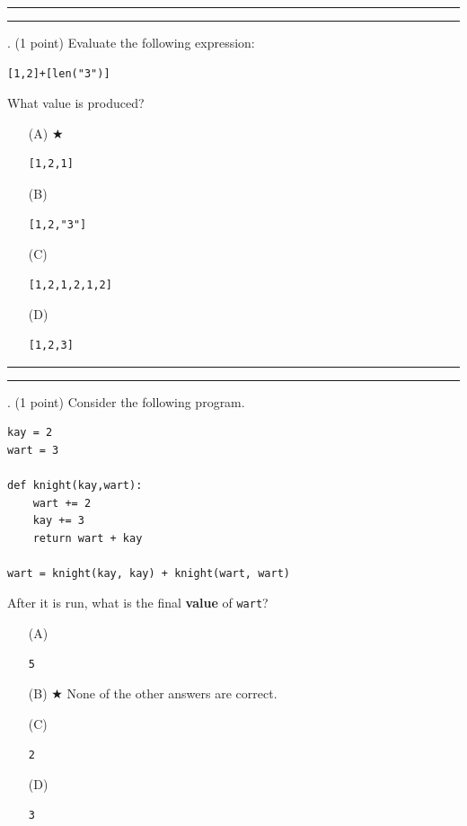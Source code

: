 \documentclass{article}
\begin{document}
\vspace*{2em}
\hrule
\vspace{2em}

\vspace{2em}
\hrule height 2pt


\newpage
{}. (1 point)
Evaluate the following expression:
\begin{verbatim}
[1,2]+[len("3")]
\end{verbatim}
What value is produced?


\begin{enumerate}
\item[(A)] $\bigstar$ 
\begin{verbatim}[1,2,1]\end{verbatim}

\item[(B)]
\begin{verbatim}[1,2,"3"]\end{verbatim}

\item[(C)]
\begin{verbatim}[1,2,1,2,1,2]\end{verbatim}

\item[(D)]
\begin{verbatim}[1,2,3]\end{verbatim}

\end{enumerate}

\vspace*{2em}
\hrule
\vspace{2em}

\vspace{2em}
\hrule height 2pt


\newpage
{}. (1 point)
Consider the following program.
\begin{verbatim}
kay = 2
wart = 3

def knight(kay,wart):
    wart += 2
    kay += 3
    return wart + kay

wart = knight(kay, kay) + knight(wart, wart)
\end{verbatim}
After it is run, what is the final \textbf{value} of \texttt{wart}?


\begin{enumerate}
\item[(A)]
\begin{verbatim}5\end{verbatim}

\item[(B)] $\bigstar$ 
None of the other answers are correct.

\item[(C)]
\begin{verbatim}2\end{verbatim}

\item[(D)]
\begin{verbatim}3\end{verbatim}

\end{enumerate}
\end{document}

